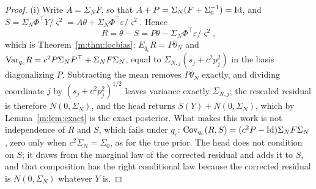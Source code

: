 \begin{proof}
(i) Write $A=\Sigma_NF$, so that $A+P=\Sigma_N(F+\Sigma_0^{-1})=\operatorname{Id}$, and $S=\Sigma_N\Phi^\top Y/\varsigma^2=A\theta+\Sigma_N\Phi^\top\varepsilon/\varsigma^2$. Hence
\[
R=\theta-S=P\theta-\Sigma_N\Phi^\top\varepsilon/\varsigma^2 ,
\]
which is Theorem~\ref{m:thm:locbias}: $E_{q_c}R=P\bar\theta_N$ and $\mathrm{Var}_{q_c}R=c^2P\Sigma_NP^\top+\Sigma_NF\Sigma_N$, equal to $\Sigma_{N,j}(s_j+c^2p_j^2)$ in the basis diagonalizing $P$. Subtracting the mean removes $P\bar\theta_N$ exactly, and dividing coordinate $j$ by $(s_j+c^2p_j^2)^{1/2}$ leaves variance exactly $\Sigma_{N,j}$; the rescaled residual is therefore $N(0,\Sigma_N)$, and the head returns $S(Y)+N(0,\Sigma_N)$, which by Lemma~\ref{m:lem:exact} is the exact posterior. What makes this work is not independence of $R$ and $S$, which fails under $q_c$: $\mathrm{Cov}_{q_c}(R,S)=(c^2P-\operatorname{Id})\Sigma_NF\Sigma_N$, zero only when $c^2\Sigma_N=\Sigma_0$, as for the true prior. The head does not condition on $S$; it draws from the marginal law of the corrected residual and adds it to $S$, and that composition has the right conditional law because the corrected residual is $N(0,\Sigma_N)$ whatever $Y$ is.


\end{proof}
